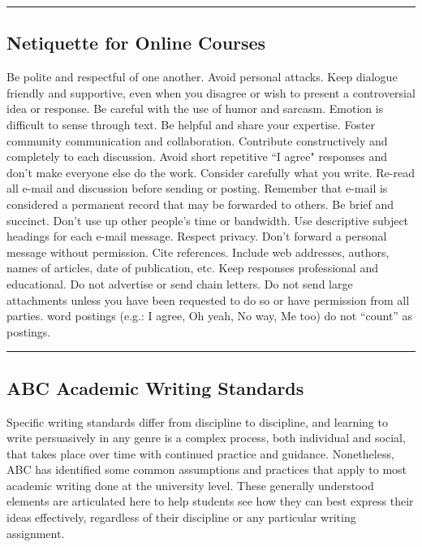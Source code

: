 \vspace{2ex}\hrule\vspace{2ex}




\subsection*{Netiquette for Online Courses}
\begin{outline}
	\1	Be polite and respectful of one another.
	\1	Avoid personal attacks. Keep dialogue friendly and supportive, even when you disagree or wish to present a controversial idea or response.
	\1	Be careful with the use of humor and sarcasm. Emotion is difficult to sense through text.
	\1	Be helpful and share your expertise. Foster community communication and collaboration.
	\1	Contribute constructively and completely to each discussion. Avoid short repetitive ``I agree" responses and don’t make everyone else do the work.
	\1	Consider carefully what you write. Re-read all e-mail and discussion before sending or posting.
	\1	Remember that e-mail is considered a permanent record that may be forwarded to others.
	\1	Be brief and succinct. Don’t use up other people’s time or bandwidth.
	\1	Use descriptive subject headings for each e-mail message.
	\1	Respect privacy. Don’t forward a personal message without permission.
	\1	Cite references. Include web addresses, authors, names of articles, date of publication, etc.
	\1	Keep responses professional and educational. Do not advertise or send chain letters.
	\1	Do not send large attachments unless you have been requested to do so or have permission from all parties.
	 word postings (e.g.: I agree, Oh yeah, No way, Me too) do not ``count'' as postings.
\end{outline}

\vspace{2ex}\hrule\vspace{2ex}



\subsection*{ABC Academic Writing Standards}
Specific writing standards differ from discipline to discipline, and learning to write persuasively in any genre is a complex process, both individual and social, that takes place over time with continued practice and guidance.  Nonetheless, ABC has identified some common assumptions and practices that apply to most academic writing done at the university level.  These generally understood elements are articulated here to help students see how they can best express their ideas effectively, regardless of their discipline or any particular writing assignment. \\
 
